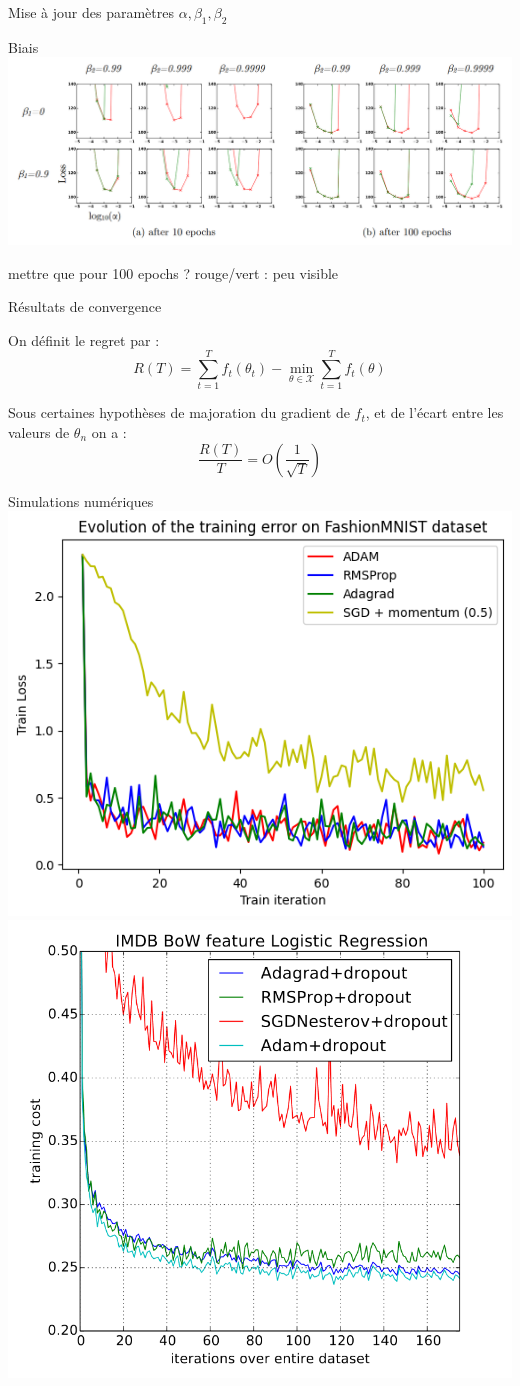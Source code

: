 \documentclass[11pt,aspectratio=169,xcolor=dvipsnames, french]{beamer}
\begin{document}
\begin{frame}{Mise à jour des paramètres}
$\alpha,\beta_1,\beta_2$
\end{frame}

\begin{frame}{Biais}
\includegraphics[width=\linewidth]{../Images/bias_correction_article.png}

mettre que pour 100 epochs ? rouge/vert : peu visible
\end{frame}

\begin{frame}{Résultats de convergence}

On définit le regret par : $$R(T)=\sum_{t=1}^{T}f_t(\theta_t)-\min_{\theta\in\mathcal{X}}\sum_{t=1}^{T}f_t(\theta)$$

\begin{theorem}
  Sous certaines hypothèses de majoration du gradient de $f_t$, et de l'écart entre les valeurs de $\theta_n$ on a : 
    $$\frac{R(T)}{T}=O\left(\frac{1}{\sqrt{T}}\right)$$  
\end{theorem}

\end{frame}



\begin{frame}{Simulations numériques}
  \includegraphics[width=0.45\linewidth]{../Images/FashionMNIST.png} \hfill \includegraphics[width=0.45\linewidth]{../Images/IMDB_article.png}
\end{frame}
\end{document}
